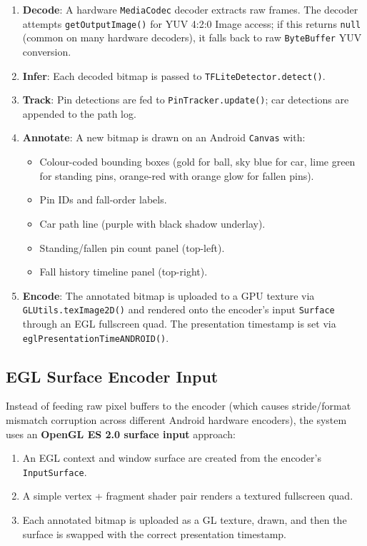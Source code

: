 \documentclass{zc-ust-hw}
\begin{document}
\begin{enumerate}
    \item \textbf{Decode}: A hardware \texttt{MediaCodec} decoder extracts raw frames.
    The decoder attempts \texttt{getOutputImage()} for YUV 4:2:0 Image access; if this returns \texttt{null} (common on many hardware decoders), it falls back to raw \texttt{ByteBuffer} YUV conversion.
    \item \textbf{Infer}: Each decoded bitmap is passed to \texttt{TFLiteDetector.detect()}.
    \item \textbf{Track}: Pin detections are fed to \texttt{PinTracker.update()}; car detections are appended to the path log.
    \item \textbf{Annotate}: A new bitmap is drawn on an Android \texttt{Canvas} with:
    \begin{itemize}
        \item Colour-coded bounding boxes (gold for ball, sky blue for car, lime green for standing pins, orange-red with orange glow for fallen pins).
        \item Pin IDs and fall-order labels.
        \item Car path line (purple with black shadow underlay).
        \item Standing/fallen pin count panel (top-left).
        \item Fall history timeline panel (top-right).
    \end{itemize}
    \item \textbf{Encode}: The annotated bitmap is uploaded to a GPU texture via \texttt{GLUtils.texImage2D()} and rendered onto the encoder's input \texttt{Surface} through an EGL fullscreen quad.
    The presentation timestamp is set via \texttt{eglPresentationTimeANDROID()}.
\end{enumerate}

\subsection{EGL Surface Encoder Input}

Instead of feeding raw pixel buffers to the encoder (which causes stride/format mismatch corruption across different Android hardware encoders), the system uses an \textbf{OpenGL ES 2.0 surface input} approach:

\begin{enumerate}
    \item An EGL context and window surface are created from the encoder's \texttt{InputSurface}.
    \item A simple vertex + fragment shader pair renders a textured fullscreen quad.
    \item Each annotated bitmap is uploaded as a GL texture, drawn, and then the surface is swapped with the correct presentation timestamp.
\end{enumerate}
\end{document}
